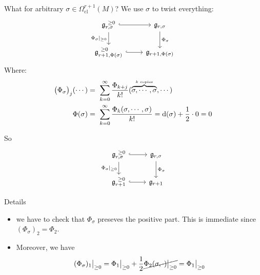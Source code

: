 \documentclass[beamer,10pt]{standalone}
\begin{document}
\begin{frame}
  What for arbitrary $\sigma \in \Omega^{r+1}_{\mathrm{cl}}(M)$?
  We use $\sigma$ to twist everything:
	\begin{displaymath}
		\begin{tikzcd}[ampersand replacement=\&]
			\g_{r,\sigma}^{~\geq 0} \ar[r,hook] \ar[d, "\Phi_\sigma \vert_{\geq 0}"']
			\& \g_{r,\sigma} \ar[d, "\Phi_\sigma"]
			\\
			\g_{r+1,\Phi(\sigma)}^{~\geq 0} \ar[r,hook] \& \g_{r+1,\Phi(\sigma)}
		\end{tikzcd}
	\end{displaymath}
	\vfill
	Where:
	\begin{align*}
		\big(\Phi_\sigma \big)_j (\cdots) 
		&=~
		\sum_{k=0}^\infty \frac{\Phi_{k+j}}{k!} (\overbrace{\sigma,\cdots,\sigma}^{\text{\tiny $k$ copies}},\cdots)
		\\
		\Phi(\sigma) &=~ \sum_{k=0}^\infty \frac{\Phi_k(\sigma,\cdots,\sigma)}{k!} = \mathrm{d}(\sigma) + \frac{1}{2}\cdot 0 = 0
	\end{align*}
\end{frame}

\begin{frame}
	So
	\begin{displaymath}
		\begin{tikzcd}[ampersand replacement=\&]
			\g_{r,\sigma}^{~\geq 0} \ar[r,hook] \ar[d, "\Phi_\sigma \vert_{\geq 0}"']
			\& \g_{r,\sigma} \ar[d, "\Phi_\sigma"]
			\\
			\g_{r+1 }^{~\geq 0} \ar[r,hook] \& \g_{r+1 }
		\end{tikzcd}
	\end{displaymath}
	\vfill
	\begin{block}{Details}
		\begin{itemize}
			\item we have to check that $\Phi_\sigma$ preseves the positive part. This is immediate since $(\Phi_\sigma)_2 = \Phi_2$.
			\item Moreover, we have 
			$$ (\Phi_\sigma)_1 \big\vert_{\geq 0} = \Phi_1 \big\vert_{\geq 0} + \frac{1}{2}\cancel{\Phi_2(\sigma,\cdot)\big\vert_{\geq 0}} = \Phi_1\big\vert_{\geq 0} $$
		\end{itemize}
	\end{block}
	\vfill
	
\end{frame}
\end{document}

